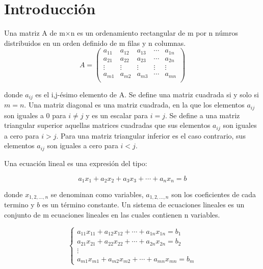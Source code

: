 \section{Introducción}

Una matriz A de m$\times$n es un ordenamiento rectangular de m por n númros distribuidos en un orden definido de m filas y n columnas.
\begin{equation}
    A = \begin{pmatrix}
        a_{11} & a_{12} & a_{13} & \cdots & a_{1n} \\
        a_{21} & a_{22} & a_{23} & \cdots & a_{2n} \\
        \vdots & \vdots & \vdots & \vdots & \vdots \\
        a_{m1} & a_{m2} & a_{m3} & \cdots & a_{mn} \\
    \end{pmatrix}
    \label{eq:def_matrix}
\end{equation}

donde $a_{ij}$ es el i,j-ésimo elemento de A. Se define una matriz cuadrada si y solo si $m=n$. Una matriz diagonal es una matriz cuadrada, en la que los elementos $a_{ij}$ son iguales a 0 para $i\neq j$ y  es un escalar para $i=j$. Se define a una matriz triangular superior aquellas matrices cuadradas que sus elementos $a_{ij}$ son iguales a cero para $i>j$. Para una matriz triangular inferior es el caso contrario, sus elementos $a_{ij}$ son iguales a cero para $i<j$.

Una ecuación lineal es una expresión del tipo:

\begin{equation}
    a_1x_1+a_2x_2+a_3x_3+\cdots + a_nx_n = b
    \label{eq:linear_equation}
\end{equation}

donde $x_{1,2,\dots,n}$ se denominan como variables, $a_{1,2,\dots,n}$ son los coeficientes de cada termino y $b$ es un término constante. Un sistema de ecuaciones lineales es un conjunto de m ecuaciones lineales en las cuales contienen n variables.

\begin{equation}
    \left\lbrace \begin{matrix}
        a_{11}x_{11}+a_{12}x_{12}+\cdots + a_{1n}x_{1n} = b_{1} \\
        a_{21}x_{21}+a_{22}x_{22}+\cdots + a_{2n}x_{2n} = b_{2} \\
        \vdots                                                  \\
        a_{m1}x_{m1}+a_{m2}x_{m2}+\cdots + a_{mn}x_{mn} = b_{m}
    \end{matrix} \right.
    \label{eq:linear_equations}
\end{equation}

